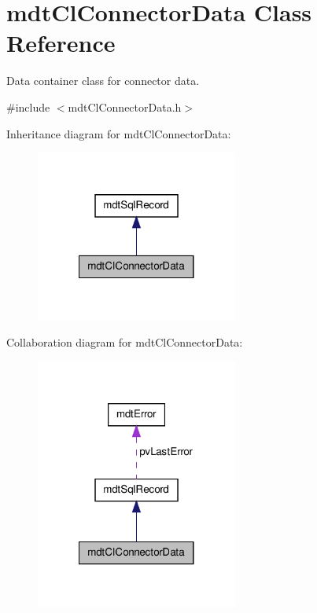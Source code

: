 \hypertarget{classmdt_cl_connector_data}{\section{mdt\-Cl\-Connector\-Data Class Reference}
\label{classmdt_cl_connector_data}
}


Data container class for connector data.  




{\ttfamily \#include $<$mdt\-Cl\-Connector\-Data.\-h$>$}



Inheritance diagram for mdt\-Cl\-Connector\-Data\-:\nopagebreak
\begin{figure}[H]
\begin{center}
\leavevmode
\includegraphics[width=188pt]{classmdt_cl_connector_data__inherit__graph}
\end{center}
\end{figure}


Collaboration diagram for mdt\-Cl\-Connector\-Data\-:\nopagebreak
\begin{figure}[H]
\begin{center}
\leavevmode
\includegraphics[width=188pt]{classmdt_cl_connector_data__coll__graph}
\end{center}
\end{figure}
